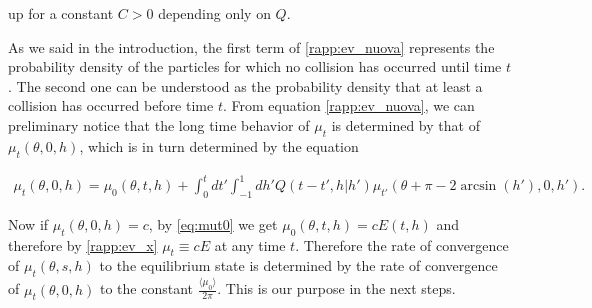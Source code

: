 \documentclass[a4paper,10pt,reqno]{amsart}
\numberwithin{equation}{subsection}
\numberwithin{figure}{subsection}
\begin{document}
up for a constant $C>0$ depending only on $Q$.

As we said in the introduction, the first term of \eqref{rapp:ev_nuova} represents the probability density of the particles for which no collision has occurred until time $t$. The second one can be understood as the probability density that at least a collision has occurred before time $t$. From equation \eqref{rapp:ev_nuova}, we can preliminary notice that the long time behavior of $\mu_t$ is determined  by that of $\mu_t(\theta,0,h)$, which is in turn determined by the equation

\begin{align}\label{eq:mut0}
\mu_t(\theta,0,h)=\mu_0(\theta,t,h)+\int_0^tdt'\int_{-1}^1dh'Q(t-t',h|h')\mu_{t'}(\theta+\pi-2\arcsin(h'),0,h').
\end{align}

Now if $\mu_t(\theta,0,h)=c$, by \eqref{eq:mut0} we get $\mu_0(\theta,t,h)=cE(t,h)$ and therefore by \eqref{rapp:ev_x} $\mu_t\equiv cE$ at any time $t$. Therefore the rate of convergence of $\mu_t(\theta,s,h)$ to the equilibrium state is determined by the rate of convergence of $\mu_t(\theta,0,h)$ to the constant $\frac{\langle\mu_0\rangle}{2\pi}$. This is our purpose in the next steps.
\end{document}
